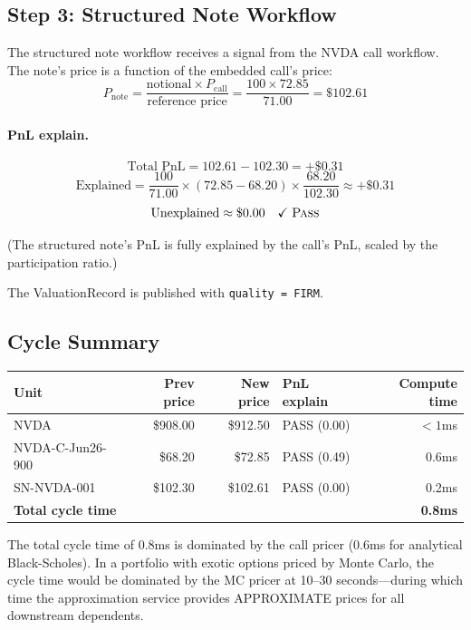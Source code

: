 \documentclass[11pt,a4paper]{article}
\begin{document}
\subsection{Step 3: Structured Note Workflow}

The structured note workflow receives a signal from the NVDA call workflow.  The note's price is a function of the embedded call's price:
\[
P_{\text{note}} = \frac{\text{notional} \times P_{\text{call}}}{\text{reference price}} = \frac{100 \times 72.85}{71.00} = \$102.61
\]

\paragraph{PnL explain.}
\[
\text{Total PnL} = 102.61 - 102.30 = +\$0.31
\]
\[
\text{Explained} = \frac{100}{71.00} \times (72.85 - 68.20) \times \frac{68.20}{102.30} \approx +\$0.31
\]
\[
\text{Unexplained} \approx \$0.00 \quad\checkmark\;\textsc{Pass}
\]

(The structured note's PnL is fully explained by the call's PnL, scaled by the participation ratio.)

The ValuationRecord is published with \texttt{quality = FIRM}.

\subsection{Cycle Summary}

\begin{center}
\small
\begin{tabular}{l r r l r}
\toprule
\textbf{Unit} & \textbf{Prev price} & \textbf{New price} & \textbf{PnL explain} & \textbf{Compute time} \\
\midrule
NVDA & \$908.00 & \$912.50 & PASS (0.00) & $<1$ms \\
NVDA-C-Jun26-900 & \$68.20 & \$72.85 & PASS (0.49) & 0.6ms \\
SN-NVDA-001 & \$102.30 & \$102.61 & PASS (0.00) & 0.2ms \\
\midrule
\multicolumn{4}{l}{\textbf{Total cycle time}} & \textbf{0.8ms} \\
\bottomrule
\end{tabular}
\end{center}

\noindent The total cycle time of 0.8ms is dominated by the call pricer (0.6ms for analytical Black-Scholes).  In a portfolio with exotic options priced by Monte Carlo, the cycle time would be dominated by the MC pricer at 10--30 seconds---during which time the approximation service provides APPROXIMATE prices for all downstream dependents.
\end{document}
